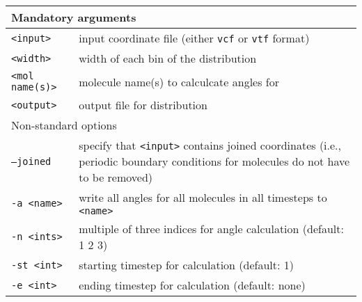 \noindent
\begin{longtable}{p{}p{}}
  \toprule
  \multicolumn{2}{l}{Mandatory arguments} \\
  \midrule
  \texttt{<input>} & input coordinate file (either \texttt{vcf} or
    \texttt{vtf} format) \\
  \texttt{<width>} & width of each bin of the distribution \\
  \texttt{<mol name(s)>} & molecule name(s) to calculcate angles for \\
  \texttt{<output>} & output file for distribution \\
  \toprule
  \multicolumn{2}{l}{Non-standard options} \\
  \midrule
  \texttt{--joined} & specify that \texttt{<input>} contains joined
    coordinates (i.e., periodic boundary conditions for molecules do not
    have to be removed) \\
  \texttt{-a <name>} & write all angles for all molecules in all timesteps
    to \texttt{<name>} \\
  \texttt{-n  <ints>} & multiple of three indices for angle calculation (default: 1 2 3) \\
  \texttt{-st <int>} & starting timestep for calculation (default: 1) \\
  \texttt{-e <int>} & ending timestep for calculation (default: none) \\
  \bottomrule
\end{longtable}

